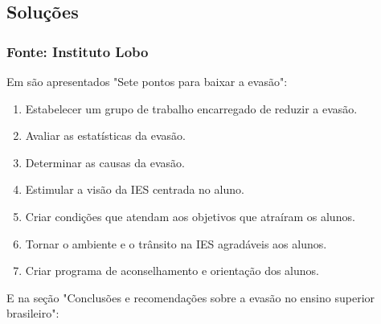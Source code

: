 \documentclass{report}
\begin{document}

\subsection{Soluções}

\subsubsection{Fonte: Instituto Lobo}

Em \cite{evasao_panorama2} são apresentados "Sete pontos para baixar a evasão":

\begin{enumerate}

\item Estabelecer um grupo de trabalho encarregado de reduzir a evasão.

\item Avaliar as estatísticas da evasão.

\item Determinar as causas da evasão.

\item Estimular a visão da IES centrada no aluno.

\item Criar condições que atendam aos objetivos que atraíram os alunos.

\item Tornar o ambiente e o trânsito na IES agradáveis aos alunos.

\item Criar programa de aconselhamento e orientação dos alunos.

\end{enumerate}

E na seção "Conclusões e recomendações sobre a evasão no ensino superior brasileiro":
\end{document}
